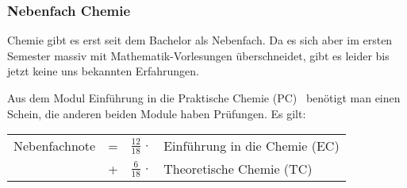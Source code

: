 \subsubsection{Nebenfach Chemie}

Chemie gibt es erst seit dem Bachelor als Nebenfach.
Da es sich aber im ersten Semester
massiv mit Mathematik-Vorlesungen überschneidet,
gibt es leider bis jetzt keine uns bekannten Erfahrungen.\\[-3ex]


\begin{center}
\end{center}
Aus dem Modul \glqq Einführung in die Praktische Chemie (PC)\grqq
~benötigt man einen Schein,
die anderen beiden Module haben Prüfungen.
Es gilt:\\[0.5ex]
\begin{tabular}{lcrl}
Nebenfachnote & = &$\frac{12}{18}\,\cdot$&Einführung in die Chemie (EC)\\[0.5ex]
              & + &$\frac{6}{18}\,\cdot$&Theoretische Chemie (TC)\\ 
\end{tabular}





